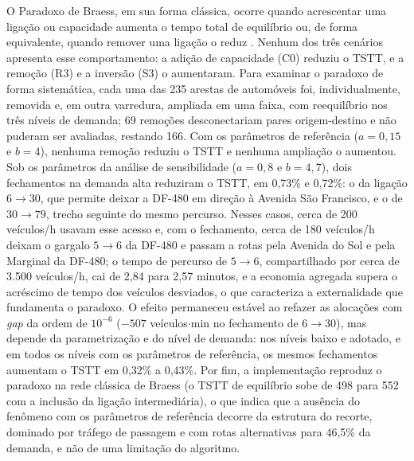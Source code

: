 \documentclass[portuguese]{sbc2025}%
\begin{document}
O Paradoxo de Braess, em sua forma clássica, ocorre quando acrescentar uma ligação ou capacidade aumenta o tempo total de equilíbrio ou, de forma equivalente, quando remover uma ligação o reduz \cite{braess2005}. Nenhum dos três cenários apresenta esse comportamento: a adição de capacidade (C0) reduziu o TSTT, e a remoção (R3) e a inversão (S3) o aumentaram. Para examinar o paradoxo de forma sistemática, cada uma das 235 arestas de automóveis foi, individualmente, removida e, em outra varredura, ampliada em uma faixa, com reequilíbrio nos três níveis de demanda; 69 remoções desconectariam pares origem-destino e não puderam ser avaliadas, restando 166. Com os parâmetros de referência ($a=0{,}15$ e $b=4$), nenhuma remoção reduziu o TSTT e nenhuma ampliação o aumentou. Sob os parâmetros da análise de sensibilidade ($a=0{,}8$ e $b=4{,}7$), dois fechamentos na demanda alta reduziram o TSTT, em 0,73\% e 0,72\%: o da ligação $6\rightarrow30$, que permite deixar a DF-480 em direção à Avenida São Francisco, e o de $30\rightarrow79$, trecho seguinte do mesmo percurso. Nesses casos, cerca de 200 veículos/h usavam esse acesso e, com o fechamento, cerca de 180 veículos/h deixam o gargalo $5\rightarrow6$ da DF-480 e passam a rotas pela Avenida do Sol e pela Marginal da DF-480; o tempo de percurso de $5\rightarrow6$, compartilhado por cerca de 3.500 veículos/h, cai de 2,84 para 2,57 minutos, e a economia agregada supera o acréscimo de tempo dos veículos desviados, o que caracteriza a externalidade que fundamenta o paradoxo. O efeito permaneceu estável ao refazer as alocações com \textit{gap} da ordem de $10^{-6}$ ($-507$ veículos$\cdot$min no fechamento de $6\rightarrow30$), mas depende da parametrização e do nível de demanda: nos níveis baixo e adotado, e em todos os níveis com os parâmetros de referência, os mesmos fechamentos aumentam o TSTT em 0,32\% a 0,43\%. Por fim, a implementação reproduz o paradoxo na rede clássica de Braess (o TSTT de equilíbrio sobe de 498 para 552 com a inclusão da ligação intermediária), o que indica que a ausência do fenômeno com os parâmetros de referência decorre da estrutura do recorte, dominado por tráfego de passagem e com rotas alternativas para 46,5\% da demanda, e não de uma limitação do algoritmo.
\end{document}

